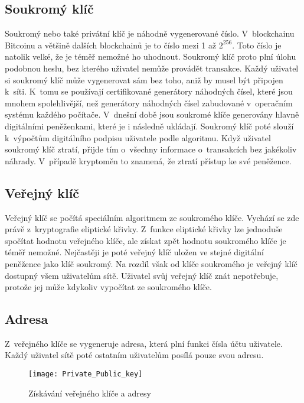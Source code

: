 \documentclass[12pt]{report}			%
\begin{document}
		\subsection{Soukromý klíč}{
Soukromý nebo také privátní klíč je náhodně vygenerované číslo. V~blockchainu Bitcoinu a většině dalších blockchainů je to číslo mezi 1 až  $2^{256}$. Toto číslo je natolik velké, že je téměř nemožné ho uhodnout. Soukromý klíč proto plní úlohu podobnou heslu, bez kterého uživatel nemůže provádět transakce.  Každý uživatel si soukromý klíč může vygenerovat sám bez toho, aniž by musel být připojen k~síti. K~tomu se používají certifikované generátory náhodných čísel, které jsou mnohem spolehlivější, než generátory náhodných čísel zabudované v~operačním systému každého počítače. V~dnešní době jsou soukromé klíče generovány hlavně digitálními peněženkami, které je i následně ukládají. Soukromý klíč poté slouží k~výpočtům digitálního podpisu uživatele podle algoritmu. Když uživatel soukromý klíč ztratí, přijde tím o~všechny informace o~transakcích bez jakékoliv náhrady. V~případě kryptoměn to znamená, že ztratí přístup ke své peněžence.  \cite{Antonopoulos2017}\cite{Frankenfield2022} 
		}
		\subsection{Veřejný klíč}{
Veřejný klíč se počítá speciálním algoritmem ze soukromého klíče. Vychází se zde právě z~kryptografie eliptické křivky. Z~funkce eliptické křivky lze jednoduše spočítat hodnotu veřejného klíče, ale získat zpět hodnotu soukromého klíče je téměř nemožné. Nejčastěji je poté veřejný klíč uložen ve stejné digitální peněžence jako klíč soukromý. Na rozdíl však od klíče soukromého je veřejný klíč dostupný všem uživatelům sítě. Uživatel svůj veřejný klíč znát nepotřebuje, protože jej může kdykoliv vypočítat ze soukromého klíče. \cite{Antonopoulos2017}
		\subsection{Adresa}{
Z~veřejného klíče se vygeneruje adresa, která plní funkci čísla účtu uživatele. Každý uživatel sítě poté ostatním uživatelům posílá pouze svou adresu.
\cite{Antonopoulos2017}
		}
\begin{figure}[h]
\caption{Získávání veřejného klíče a adresy \cite{Antonopoulos2017}}
\texttt{[image: Private\_Public\_key]}	
\centering
\label{Private_key}
\end{figure}
		}
\end{document}
